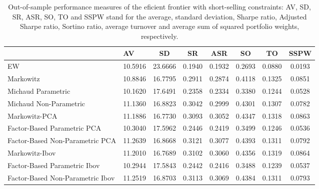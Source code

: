 \begin{table}

\caption{\label{tab:empirical_ef_2}Out-of-sample performance measures of the eficient frontier with short-selling constraints: AV, SD, SR, ASR, SO, TO and SSPW stand for the average, standard deviation, Sharpe ratio, Adjusted Sharpe ratio, Sortino ratio, average turnover and average sum of squared portfolio weights, respectively.}
\centering
\begin{tabular}[t]{l|l|c|c|c|c|c|c}
\hline
  & AV & SD & SR & ASR & SO & TO & SSPW\\
\hline
EW & 10.5916 & 23.6666 & 0.1940 & 0.1932 & 0.2693 & 0.0880 & 0.0193\\
\hline
Markowitz & 10.8846 & 16.7795 & 0.2911 & 0.2874 & 0.4118 & 0.1325 & 0.0851\\
\hline
Michaud Parametric & 10.1620 & 17.6491 & 0.2358 & 0.2334 & 0.3380 & 0.1244 & 0.0528\\
\hline
Michaud Non-Parametric & 11.1360 & 16.8823 & 0.3042 & 0.2999 & 0.4301 & 0.1307 & 0.0782\\
\hline
Markowitz-PCA & 11.1886 & 16.7730 & 0.3093 & 0.3052 & 0.4347 & 0.1318 & 0.0863\\
\hline
Factor-Based Parametric PCA & 10.3040 & 17.5962 & 0.2446 & 0.2419 & 0.3499 & 0.1246 & 0.0536\\
\hline
Factor-Based Non-Parametric PCA & 11.2639 & 16.8668 & 0.3121 & 0.3077 & 0.4393 & 0.1311 & 0.0792\\
\hline
Markowitz-Ibov & 11.2010 & 16.7689 & 0.3102 & 0.3060 & 0.4356 & 0.1319 & 0.0864\\
\hline
Factor-Based Parametric Ibov & 10.2944 & 17.5843 & 0.2442 & 0.2416 & 0.3488 & 0.1239 & 0.0537\\
\hline
Factor-Based Non-Parametric Ibov & 11.2519 & 16.8703 & 0.3113 & 0.3069 & 0.4384 & 0.1311 & 0.0793\\
\hline
\end{tabular}
\end{table}
